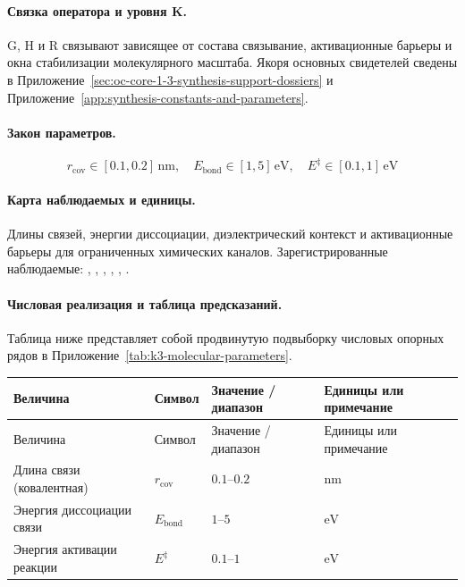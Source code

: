 \paragraph{Связка оператора и уровня K.}
G, H и R связывают зависящее от состава связывание, активационные барьеры и окна стабилизации молекулярного масштаба.
Якоря основных свидетелей сведены в Приложение~\ref{sec:oc-core-1-3-synthesis-support-dossiers} и Приложение~\ref{app:synthesis-constants-and-parameters}.

\paragraph{Закон параметров.}
\[
r_{\mathrm{cov}} \in [0.1, 0.2]\,\mathrm{nm},\quad E_{\mathrm{bond}} \in [1, 5]\,\mathrm{eV},\quad E^\ddagger \in [0.1, 1]\,\mathrm{eV}
\]

\paragraph{Карта наблюдаемых и единицы.}
Длины связей, энергии диссоциации, диэлектрический контекст и активационные барьеры для ограниченных химических каналов.
Зарегистрированные наблюдаемые: , \allowbreak {}, \allowbreak {}, \allowbreak {}, \allowbreak {}, \allowbreak {}.

\paragraph{Числовая реализация и таблица предсказаний.}
Таблица ниже представляет собой продвинутую подвыборку числовых опорных рядов в Приложение~\ref{tab:k3-molecular-parameters}.
\begin{longtable}{@{}L{0.27\textwidth}L{0.15\textwidth}L{0.24\textwidth}L{0.16\textwidth}@{}}
\toprule
Величина & Символ & Значение / диапазон & Единицы или примечание \\
\midrule
\endfirsthead
\toprule
Величина & Символ & Значение / диапазон & Единицы или примечание \\
\midrule
\endhead
Длина связи (ковалентная) & $\scriptstyle r_{\mathrm{cov}}$ & $0.1\text{--}0.2$ & $\mathrm{nm}$ \\
Энергия диссоциации связи & $\scriptstyle E_{\mathrm{bond}}$ & $1\text{--}5$ & $\mathrm{eV}$ \\
Энергия активации реакции & $\scriptstyle E^\ddagger$ & $0.1\text{--}1$ & $\mathrm{eV}$ \\
\bottomrule
\end{longtable}

